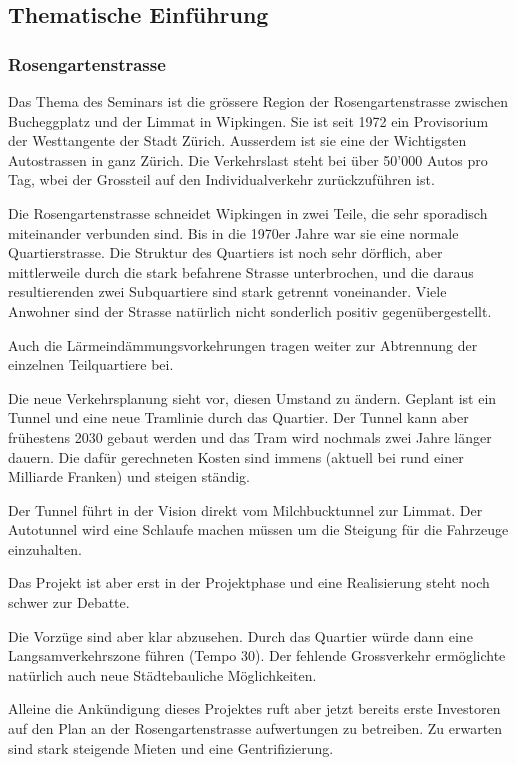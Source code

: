 \documentclass[11pt]{article}
\begin{document}
\subsection{Thematische Einführung}
\label{sec-2-1}

\subsubsection{Rosengartenstrasse}
\label{sec-2-1-1}

Das Thema des Seminars ist die grössere Region der Rosengartenstrasse
zwischen Bucheggplatz und der Limmat in Wipkingen. Sie ist seit 1972 ein
Provisorium der Westtangente der Stadt Zürich. Ausserdem ist sie eine der
Wichtigsten Autostrassen in ganz Zürich. Die Verkehrslast steht bei über
50'000 Autos pro Tag, wbei der Grossteil auf den Individualverkehr
zurückzuführen ist.

Die Rosengartenstrasse schneidet Wipkingen in zwei Teile, die sehr
sporadisch miteinander verbunden sind. Bis in die 1970er Jahre war sie eine
normale Quartierstrasse. Die Struktur des Quartiers ist noch sehr dörflich,
aber mittlerweile durch die stark befahrene Strasse unterbrochen, und die
daraus resultierenden zwei Subquartiere sind stark getrennt
voneinander. Viele Anwohner sind der Strasse natürlich nicht sonderlich
positiv gegenübergestellt.

Auch die Lärmeindämmungsvorkehrungen tragen weiter zur Abtrennung der
einzelnen Teilquartiere bei.

Die neue Verkehrsplanung sieht vor, diesen Umstand zu ändern. Geplant ist
ein Tunnel und eine neue Tramlinie durch das Quartier. Der Tunnel kann aber
frühestens 2030 gebaut werden und das Tram wird nochmals zwei Jahre länger
dauern. Die dafür gerechneten Kosten sind immens (aktuell bei rund einer
Milliarde Franken) und steigen ständig.

Der Tunnel führt in der Vision direkt vom Milchbucktunnel zur Limmat. Der
Autotunnel wird eine Schlaufe machen müssen um die Steigung für die
Fahrzeuge einzuhalten.

Das Projekt ist aber erst in der Projektphase und eine Realisierung steht
noch schwer zur Debatte.

Die Vorzüge sind aber klar abzusehen. Durch das Quartier würde dann eine
Langsamverkehrszone führen (Tempo 30). Der fehlende Grossverkehr
ermöglichte natürlich auch neue Städtebauliche Möglichkeiten.

Alleine die Ankündigung dieses Projektes ruft aber jetzt bereits erste
Investoren auf den Plan an der Rosengartenstrasse aufwertungen zu
betreiben. Zu erwarten sind stark steigende Mieten und eine
Gentrifizierung.
\end{document}
